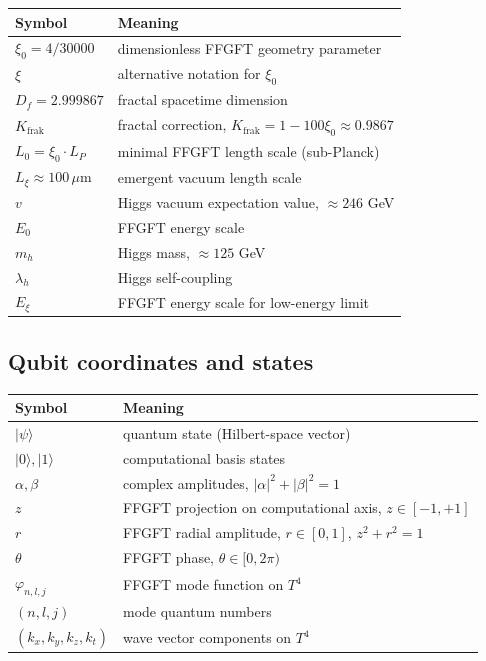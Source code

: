 \begin{center}
\renewcommand{\arraystretch}{1.3}
{\small
\begin{tabular}{>{\raggedright\arraybackslash}p{2.5cm}>{\raggedright\arraybackslash}p{8.5cm}}
\toprule
\textbf{Symbol} & \textbf{Meaning} \\
\midrule
$\xi_0 = 4/30000$ & dimensionless FFGFT geometry parameter \\
$\xi$ & alternative notation for $\xi_0$ \\
$D_f = 2.999867$ & fractal spacetime dimension \\
$K_{\text{frak}}$ & fractal correction, $K_{\text{frak}} = 1 - 100\xi_0 \approx 0.9867$ \\
$L_0 = \xi_0 \cdot L_P$ & minimal FFGFT length scale (sub-Planck) \\
$L_\xi \approx 100\,\mu$m & emergent vacuum length scale \\
$v$ & Higgs vacuum expectation value, $\approx 246$ GeV \\
$E_0$ & FFGFT energy scale \\
$m_h$ & Higgs mass, $\approx 125$ GeV \\
$\lambda_h$ & Higgs self-coupling \\
$E_\xi$ & FFGFT energy scale for low-energy limit \\
\bottomrule
\end{tabular}
}
\renewcommand{\arraystretch}{1.0}
\end{center}

\subsection*{Qubit coordinates and states}

\begin{center}
\renewcommand{\arraystretch}{1.3}
{\small
\begin{tabular}{>{\raggedright\arraybackslash}p{2.5cm}>{\raggedright\arraybackslash}p{8.5cm}}
\toprule
\textbf{Symbol} & \textbf{Meaning} \\
\midrule
$|\psi\rangle$ & quantum state (Hilbert-space vector) \\
$|0\rangle, |1\rangle$ & computational basis states \\
$\alpha, \beta$ & complex amplitudes, $|\alpha|^2 + |\beta|^2 = 1$ \\
$z$ & FFGFT projection on computational axis, $z \in [-1, +1]$ \\
$r$ & FFGFT radial amplitude, $r \in [0, 1]$, $z^2 + r^2 = 1$ \\
$\theta$ & FFGFT phase, $\theta \in [0, 2\pi)$ \\
$\varphi_{n,l,j}$ & FFGFT mode function on $T^4$ \\
$(n, l, j)$ & mode quantum numbers \\
$(k_x, k_y, k_z, k_t)$ & wave vector components on $T^4$ \\
\bottomrule
\end{tabular}
}
\renewcommand{\arraystretch}{1.0}
\end{center}

